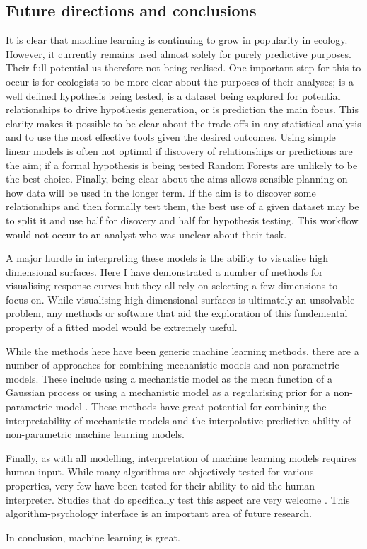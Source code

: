 \documentclass[10pt,]{article}
\begin{document}
\subsection{Future directions and conclusions}\label{future-directions-and-conclusions}

It is clear that machine learning is continuing to grow in popularity in ecology. However, it currently remains used almost solely for purely predictive purposes. Their full potential us therefore not being realised. One important step for this to occur is for ecologists to be more clear about the purposes of their analyses; is a well defined hypothesis being tested, is a dataset being explored for potential relationships to drive hypothesis generation, or is prediction the main focus. This clarity makes it possible to be clear about the trade-offs in any statistical analysis and to use the most effective tools given the desired outcomes. Using simple linear models is often not optimal if discovery of relationships or predictions are the aim; if a formal hypothesis is being tested Random Forests are unlikely to be the best choice. Finally, being clear about the aims allows sensible planning on how data will be used in the longer term. If the aim is to discover some relationships and then formally test them, the best use of a given dataset may be to split it and use half for disovery and half for hypothesis testing. This workflow would not occur to an analyst who was unclear about their task.

A major hurdle in interpreting these models is the ability to visualise high dimensional surfaces. Here I have demonstrated a number of methods for visualising response curves but they all rely on selecting a few dimensions to focus on. While visualising high dimensional surfaces is ultimately an unsolvable problem, any methods or software that aid the exploration of this fundemental property of a fitted model would be extremely useful.

While the methods here have been generic machine learning methods, there are a number of approaches for combining mechanistic models and non-parametric models. These include using a mechanistic model as the mean function of a Gaussian process \citep{rasmussen2004gaussian} or using a mechanistic model as a regularising prior for a non-parametric model \citep{lyddon2018nonparametric}. These methods have great potential for combining the interpretability of mechanistic models and the interpolative predictive ability of non-parametric machine learning models.

Finally, as with all modelling, interpretation of machine learning models requires human input. While many algorithms are objectively tested for various properties, very few have been tested for their ability to aid the human interpreter. Studies that do specifically test this aspect are very welcome \citep{bastani2017interpreting}. This algorithm-psychology interface is an important area of future research.

In conclusion, machine learning is great.


\end{document}
